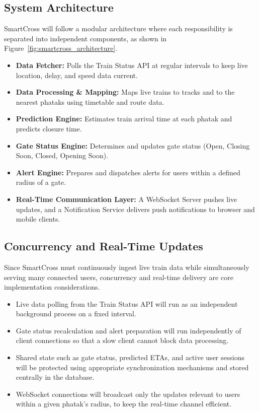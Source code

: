 \documentclass[11pt,a4paper]{article}
\begin{document}
\subsection{System Architecture}

SmartCross will follow a modular architecture where each responsibility is separated into independent components, as shown in Figure~\ref{fig:smartcross_architecture}.

\begin{itemize}
    \item \textbf{Data Fetcher:} Polls the Train Status API at regular intervals to keep live location, delay, and speed data current.

    \item \textbf{Data Processing \& Mapping:} Maps live trains to tracks and to the nearest phataks using timetable and route data.

    \item \textbf{Prediction Engine:} Estimates train arrival time at each phatak and predicts closure time.

    \item \textbf{Gate Status Engine:} Determines and updates gate status (Open, Closing Soon, Closed, Opening Soon).

    \item \textbf{Alert Engine:} Prepares and dispatches alerts for users within a defined radius of a gate.

    \item \textbf{Real-Time Communication Layer:} A WebSocket Server pushes live updates, and a Notification Service delivers push notifications to browser and mobile clients.
\end{itemize}


\subsection{Concurrency and Real-Time Updates}

Since SmartCross must continuously ingest live train data while simultaneously serving many connected users, concurrency and real-time delivery are core implementation considerations.

\begin{itemize}
    \item Live data polling from the Train Status API will run as an independent background process on a fixed interval.

    \item Gate status recalculation and alert preparation will run independently of client connections so that a slow client cannot block data processing.

    \item Shared state such as gate status, predicted ETAs, and active user sessions will be protected using appropriate synchronization mechanisms and stored centrally in the database.

    \item WebSocket connections will broadcast only the updates relevant to users within a given phatak's radius, to keep the real-time channel efficient.
\end{itemize}
\end{document}
